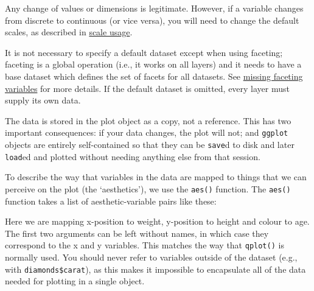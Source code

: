 \noindent Any change of values or dimensions is legitimate. However, if
a variable changes from discrete to continuous (or vice versa), you will
need to change the default scales, as described in
\hyperref[sec:scale-usage]{scale usage}.

It is not necessary to specify a default dataset except when using
faceting; faceting is a global operation (i.e., it works on all layers)
and it needs to have a base dataset which defines the set of facets for
all datasets. See \hyperref[sub:missing-faceting-columns]{missing
faceting variables} for more details. If the default dataset is omitted,
every layer must supply its own data.

The data is stored in the plot object as a copy, not a reference. This
has two important consequences: if your data changes, the plot will not;
and \texttt{ggplot} objects are entirely self-contained so that they can
be \texttt{save}d to disk and later \texttt{load}ed and plotted without
needing anything else from that session.


To describe the way that variables in the data are mapped to things that
we can perceive on the plot (the `aesthetics'), we use the
\texttt{aes()} function. The \texttt{aes()} function takes a list of
aesthetic-variable pairs like these: 
 

\begin{Shaded}
\begin{Highlighting}[]
\NormalTok{(}   
\end{Highlighting}
\end{Shaded}

Here we are mapping x-position to weight, y-position to height and
colour to age. The first two arguments can be left without names, in
which case they correspond to the x and y variables. This matches the
way that \texttt{qplot()} is normally used. You should never refer to
variables outside of the dataset (e.g., with \texttt{diamonds\$carat}),
as this makes it impossible to encapsulate all of the data needed for
plotting in a single object.

